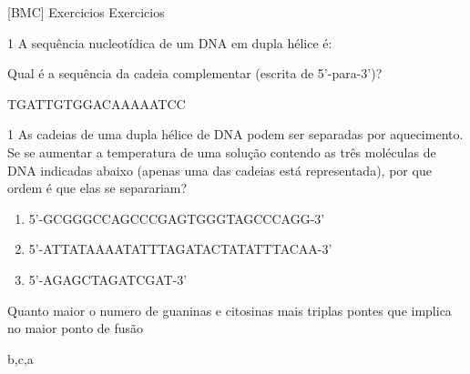 \documentclass[\mainfilename]{subfiles}
\date{\Large 16 de Setembro de 2022}
\begin{document}
[BMC]
{Exercicios}
{Exercicios}

\begin{questionBox}1{ %
    A sequência nucleotídica de um DNA em dupla hélice é:
} %

    Qual é a sequência da cadeia complementar (escrita de 5'-para-3')?

    \begin{answerBox}{} %
        TGATTGTGGACAAAAATCC
    \end{answerBox}

\end{questionBox}

\begin{questionBox}1{ %
    As cadeias de uma dupla hélice de DNA podem ser separadas por aquecimento. Se se aumentar a temperatura de uma solução contendo as três moléculas de DNA indicadas abaixo (apenas uma das cadeias está representada), por que ordem é que elas se separariam?
} %

    \begin{enumerate}[label=\alph{enumi})]
        \item 5'-GCGGGCCAGCCCGAGTGGGTAGCCCAGG-3'
        \item 5'-ATTATAAAATATTTAGATACTATATTTACAA-3'
        \item 5'-AGAGCTAGATCGAT-3'
    \end{enumerate}

    \begin{answerBox}{} %
        Quanto maior o numero de guaninas e citosinas mais triplas pontes que implica no maior ponto de fusão

        b,c,a
    \end{answerBox}

\end{questionBox}
\end{document}
